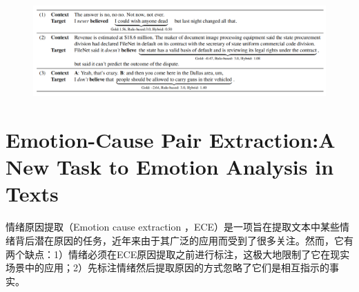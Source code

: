 \documentclass[a4paper,UTF8]{article}
\numberwithin{equation}{section}
\begin{document}
\begin{figure}[H]
	\centering
	\includegraphics[width=\textwidth]{2-1.png}
\end{figure}

\newpage
\section{Emotion-Cause Pair Extraction:A New Task to Emotion Analysis in Texts}
情绪原因提取（Emotion cause extraction ，ECE）是一项旨在提取文本中某些情绪背后潜在原因的任务，近年来由于其广泛的应用而受到了很多关注。然而，它有两个缺点：1）情绪必须在ECE原因提取之前进行标注，这极大地限制了它在现实场景中的应用；2）先标注情绪然后提取原因的方式忽略了它们是相互指示的事实。
\end{document}
